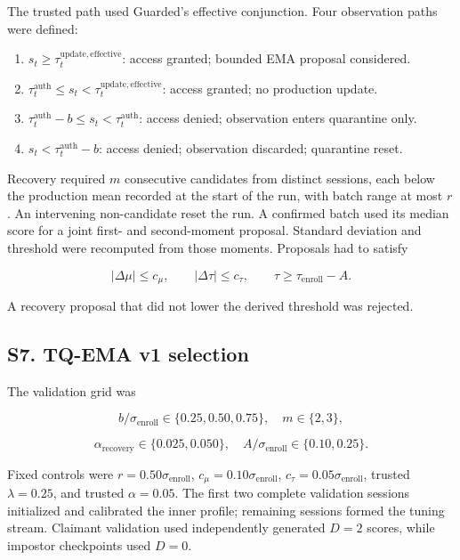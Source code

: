 \documentclass[technologies,supfile,submit,moreauthors]{Definitions/mdpi}
\begin{document}
The trusted path used Guarded's effective conjunction. Four observation paths were defined:

\begin{enumerate}
\def\labelenumi{\arabic{enumi}.}
\item
  \(s_t\geq\tau^{\mathrm{update,effective}}_t\): access granted; bounded EMA proposal considered.
\item
  \(\tau^{\mathrm{auth}}_t\leq s_t<\tau^{\mathrm{update,effective}}_t\): access granted; no production update.
\item
  \(\tau^{\mathrm{auth}}_t-b\leq s_t<\tau^{\mathrm{auth}}_t\): access denied; observation enters quarantine only.
\item
  \(s_t<\tau^{\mathrm{auth}}_t-b\): access denied; observation discarded; quarantine reset.
\end{enumerate}

Recovery required \(m\) consecutive candidates from distinct sessions, each below the production mean recorded at the start of the run, with batch range at most \(r\). An intervening non-candidate reset the run. A confirmed batch used its median score for a joint first- and second-moment proposal. Standard deviation and threshold were recomputed from those moments. Proposals had to satisfy

\[
|\Delta\mu|\leq c_\mu,
\qquad
|\Delta\tau|\leq c_\tau,
\qquad
\tau\geq\tau_{\mathrm{enroll}}-A.
\]

A recovery proposal that did not lower the derived threshold was rejected.

\subsection*{S7. TQ-EMA v1 selection}\label{sm:s7}

The validation grid was

\[
b/\sigma_{\mathrm{enroll}}\in\{0.25,0.50,0.75\},
\quad m\in\{2,3\},
\]

\[
\alpha_{\mathrm{recovery}}\in\{0.025,0.050\},
\quad A/\sigma_{\mathrm{enroll}}\in\{0.10,0.25\}.
\]

Fixed controls were \(r=0.50\sigma_{\mathrm{enroll}}\), \(c_\mu=0.10\sigma_{\mathrm{enroll}}\), \(c_\tau=0.05\sigma_{\mathrm{enroll}}\), trusted \(\lambda=0.25\), and trusted \(\alpha=0.05\). The first two complete validation sessions initialized and calibrated the inner profile; remaining sessions formed the tuning stream. Claimant validation used independently generated \(D=2\) scores, while impostor checkpoints used \(D=0\).
\end{document}
